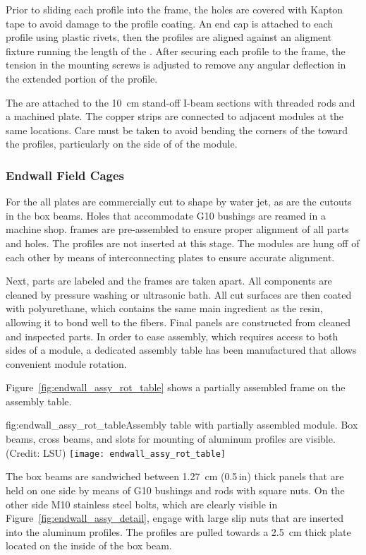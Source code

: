 Prior to sliding each profile into the  frame, the holes %
are covered with Kapton tape to avoid damage to the profile coating. An end cap is attached to each profile using plastic rivets, then the profiles are aligned against an aligment fixture running the length of the . After securing each profile to the frame, the tension in the mounting screws is adjusted to remove any angular deflection in the extended portion of the profile.

The  are attached to the \SI{10}{\cm} stand-off I-beam sections with threaded rods and a machined plate. The copper strips are connected to adjacent modules at the same locations. Care must be taken to avoid bending the corners of the  toward the profiles, particularly on the  side of of the module.

\subsubsection{Endwall Field Cages}

For the  all  plates are commercially cut to shape by water jet, as are the cutouts in the  box beams. %
Holes that accommodate G10 bushings are reamed in a machine shop.  frames are pre-assembled to ensure proper alignment of all  parts and %
holes. The profiles are not inserted at this stage. The  modules are hung off of each other by means of interconnecting  plates to ensure accurate alignment.

Next, parts are labeled and the frames are taken apart. All components are cleaned by pressure washing or ultrasonic bath. All cut  surfaces are then coated with polyurethane, which contains the same main ingredient as the  resin, allowing it to bond well to the  fibers. Final panels are constructed from cleaned and inspected parts. In order to ease assembly, which requires access to both sides of a module,
a dedicated assembly table has been manufactured that allows convenient module rotation. 

Figure~\ref{fig:endwall_assy_rot_table} shows a partially assembled   frame on the assembly table.
\begin{dunefigure}{fig:endwall_assy_rot_table}{Assembly table with partially assembled  module. Box beams, cross beams, and slots for mounting of aluminum profiles are visible. (Credit: LSU)}
 \texttt{[image: endwall\_assy\_rot\_table]}
 \end{dunefigure}
The  box beams are sandwiched between \SI{1.27}{\cm} (\num{0.5}\,in) thick  panels that are held on one side by means of G10 bushings and rods with square nuts.
On the other side M10 stainless steel bolts, which are clearly visible in Figure~\ref{fig:endwall_assy_detail},  
engage with large slip nuts that are inserted into the aluminum profiles. The profiles 
are pulled towards a \SI{2.5}{\cm} thick  plate located 
on the inside of the box beam.
%

